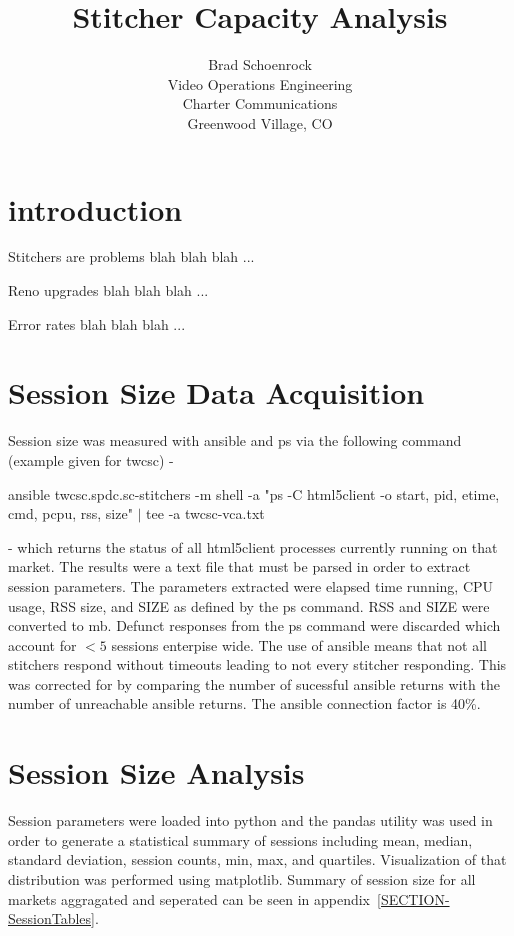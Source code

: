 \documentclass{article}
\author{Brad Schoenrock\\Video Operations Engineering\\Charter Communications\\Greenwood Village, CO}
\title{Stitcher Capacity Analysis}
\date{}
\begin{document}
\maketitle

\section{introduction}

Stitchers are problems blah blah blah ...

Reno upgrades blah blah blah ...

Error rates blah blah blah ...

\section{Session Size Data Acquisition}

Session size was measured with ansible and ps via the following command (example given for twcsc) - 

\noindent ansible twcsc.spdc.sc-stitchers -m shell -a "ps -C html5client -o start, pid, etime, cmd, pcpu, rss, size" $|$ tee -a twcsc-vca.txt

\noindent - which returns the status of all html5client processes currently running on that market. The results were a text file that must be parsed in order to extract session parameters. The parameters extracted were elapsed time running, CPU usage, RSS size, and SIZE as defined by the ps command. RSS and SIZE were converted to mb. Defunct responses from the ps command were discarded which account for $<5$ sessions enterpise wide. The use of ansible means that not all stitchers respond without timeouts leading to not every stitcher responding. This was corrected for by comparing the number of sucessful ansible returns with the number of unreachable ansible returns. The ansible connection factor is 40\%. 

\section{Session Size Analysis}

Session parameters were loaded into python and the pandas utility was used in order to generate a statistical summary of sessions including mean, median, standard deviation, session counts, min, max, and quartiles. Visualization of that distribution was performed using matplotlib. Summary of session size for all markets aggragated and seperated can be seen in appendix~\ref{SECTION-SessionTables}. 
\end{document}
